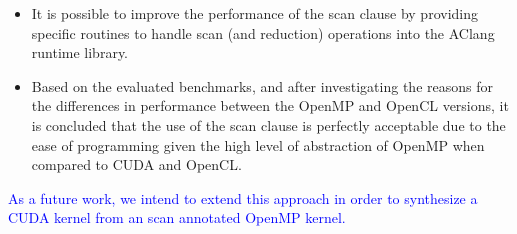 \documentclass[Ingles]{ic-tese-v1}
\newcommand{\new}[1]{\noindent\textcolor{blue}{ {#1}}}
\newcommand{\new}[1]{#1}
\begin{document}
\begin{itemize}
	\item It is possible to improve  the performance of the scan clause by
	providing specific routines to handle scan (and reduction) operations
	into the AClang  runtime  library.
	\item Based on the evaluated benchmarks, and after investigating the
	reasons for the differences in performance between the OpenMP and
	OpenCL versions, it is concluded that the use of the scan clause is
	perfectly acceptable due to the ease of programming given the high
	level of abstraction of OpenMP when compared to CUDA and OpenCL.
\end{itemize}

\new{As a future work, we intend to extend this approach in order  to synthesize a CUDA kernel
from an scan annotated  OpenMP kernel.}



\end{document}
